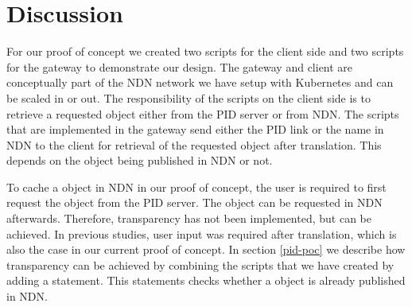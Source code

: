 \section{Discussion}\label{disc}







For our proof of concept we created two scripts for the client side and two scripts for the gateway to demonstrate our design. The gateway and client are conceptually part of the NDN network we have setup with Kubernetes and can be scaled in or out. The responsibility of the scripts on the client side is to retrieve a requested object either from the PID server or from NDN. The scripts that are implemented in the gateway send either the PID link or the name in NDN to the client for retrieval of the requested object after translation. This depends on the object being published in NDN or not.

To cache a object in NDN in our proof of concept, the user is required to first request the object from the PID server. The object can be requested in NDN afterwards. Therefore,  transparency has not been implemented, but can be achieved. In previous studies, user input was required after translation, which is also the case in our current proof of concept. In section \ref{pid-poc} we describe how transparency can be achieved by combining the scripts that we have created by adding a statement. This statements checks whether a object is already published in NDN.


